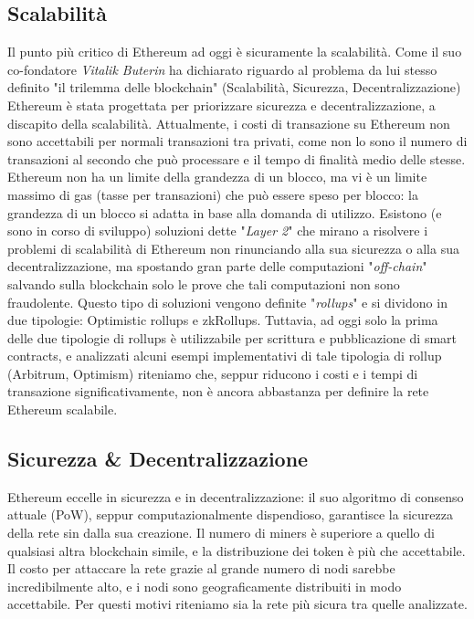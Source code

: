 \documentclass[a4paper, 12pt]{article}
\begin{document}
\subsection*{Scalabilità}
Il punto più critico di Ethereum ad oggi è sicuramente la scalabilità.
Come il suo co-fondatore \textit{Vitalik Buterin} ha dichiarato riguardo al problema da lui stesso definito "il trilemma delle blockchain" (Scalabilità, Sicurezza, Decentralizzazione)
Ethereum è stata progettata per priorizzare sicurezza e decentralizzazione, a discapito della scalabilità.
Attualmente, i costi di transazione su Ethereum non sono accettabili per normali transazioni tra privati, come non lo sono il numero di transazioni al secondo che può
processare e il tempo di finalità medio delle stesse.
Ethereum non ha un limite della grandezza di un blocco, ma vi è un limite massimo di gas (tasse per transazioni) che può essere speso per blocco: la grandezza di un blocco si adatta
in base alla domanda di utilizzo.
Esistono (e sono in corso di sviluppo) soluzioni dette "\textit{Layer 2}" che mirano a risolvere i problemi di scalabilità di Ethereum non rinunciando alla sua sicurezza
o alla sua decentralizzazione, ma spostando gran parte delle computazioni "\textit{off-chain}" salvando sulla blockchain solo le prove che tali computazioni non sono
fraudolente. Questo tipo di soluzioni vengono definite "\textit{rollups}" e si dividono in due tipologie: Optimistic rollups e zkRollups.
Tuttavia, ad oggi solo la prima delle due tipologie di rollups è utilizzabile per scrittura e pubblicazione di smart contracts, e analizzati alcuni esempi
implementativi di tale tipologia di rollup (Arbitrum, Optimism) riteniamo che, seppur riducono i costi e i tempi di transazione significativamente,
non è ancora abbastanza per definire la rete Ethereum scalabile.

\subsection*{Sicurezza \& Decentralizzazione}
Ethereum eccelle in sicurezza e in decentralizzazione: il suo algoritmo di consenso attuale (PoW), seppur computazionalmente dispendioso, garantisce la sicurezza della rete sin dalla sua creazione. Il numero di miners è superiore a quello di qualsiasi altra blockchain simile, e la distribuzione dei token è più che accettabile.
Il costo per attaccare la rete grazie al grande numero di nodi sarebbe incredibilmente alto, e i nodi sono geograficamente distribuiti in modo accettabile.
Per questi motivi riteniamo sia la rete più sicura tra quelle analizzate.
\end{document}
